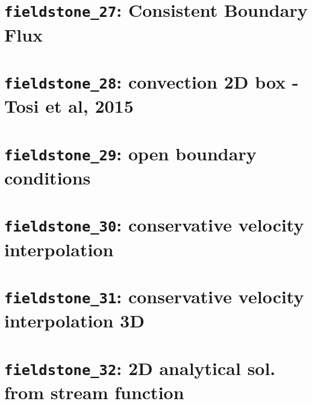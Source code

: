 \documentclass[a4paper]{article}
\begin{document}
\newpage %
\section{{\tt fieldstone\_27}: Consistent Boundary Flux \label{f27}} %

\newpage %
\section{{\tt fieldstone\_28}: convection 2D box - Tosi et al, 2015 \label{f28}} %

\newpage %
\section{{\tt fieldstone\_29}: open boundary conditions \label{f29}} %

\newpage %
\section{{\tt fieldstone\_30}: conservative velocity interpolation \label{f30}} %

\newpage %
\section{{\tt fieldstone\_31}: conservative velocity interpolation 3D \label{f31}} %

\newpage %
\section{{\tt fieldstone\_32}: 2D analytical sol. from stream function \label{f32}} %
\end{document}
